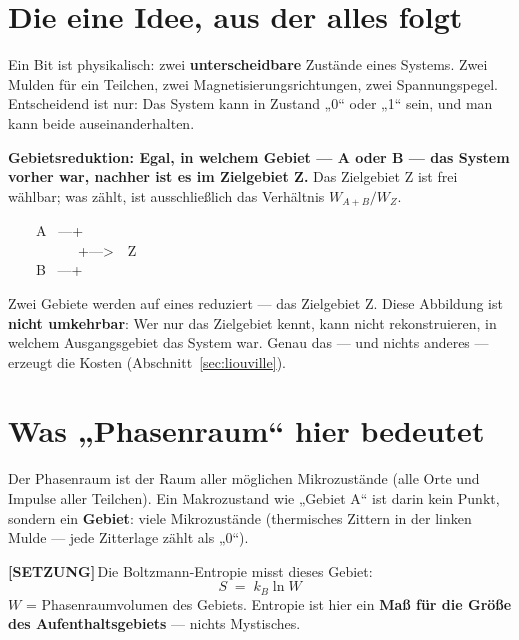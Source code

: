 \documentclass[11pt,a4paper]{article}
\newcommand{\LS}{\textcolor{laySet}{\textbf{\footnotesize\textsf{[SETZUNG]}}}\,}
\begin{document}
\section{Die eine Idee, aus der alles folgt}

Ein Bit ist physikalisch: zwei \textbf{unterscheidbare} Zustände eines Systems.
Zwei Mulden für ein Teilchen, zwei Magnetisierungsrichtungen, zwei Spannungspegel.
Entscheidend ist nur: Das System kann in Zustand „0“ oder „1“ sein, und man kann
beide auseinanderhalten.

\textbf{Gebietsreduktion: Egal, in welchem Gebiet --- A oder B --- das System
vorher war, nachher ist es im Zielgebiet Z.} Das Zielgebiet Z ist frei wählbar;
was zählt, ist ausschließlich das Verhältnis $W_{A+B}/W_Z$.

\begin{center}
\begin{minipage}{0.42\textwidth}
\ttfamily\small
\begin{tabbing}
\ \ \ \ A \ ---+\\
\ \ \ \ \ \ \ \ \ \ +--->\ \ Z\\
\ \ \ \ B \ ---+
\end{tabbing}
\end{minipage}
\end{center}

Zwei Gebiete werden auf eines reduziert --- das Zielgebiet Z. Diese Abbildung ist
\textbf{nicht umkehrbar}: Wer nur das Zielgebiet kennt, kann nicht rekonstruieren,
in welchem Ausgangsgebiet das System war. Genau das --- und nichts anderes ---
erzeugt die Kosten (Abschnitt~\ref{sec:liouville}).

\section{Was „Phasenraum“ hier bedeutet}

Der Phasenraum ist der Raum aller möglichen Mikrozustände (alle Orte und Impulse
aller Teilchen). Ein Makrozustand wie „Gebiet A“ ist darin kein Punkt, sondern ein
\textbf{Gebiet}: viele Mikrozustände (thermisches Zittern in der linken Mulde ---
jede Zitterlage zählt als „0“).

\LS Die Boltzmann-Entropie misst dieses Gebiet:
\[
  S \;=\; k_B \ln W
\]
$W$ = Phasenraumvolumen des Gebiets. Entropie ist hier ein \textbf{Maß für die
Größe des Aufenthaltsgebiets} --- nichts Mystisches.
\end{document}
